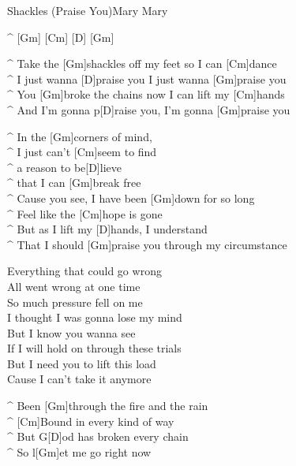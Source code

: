 \begin{song}{Shackles (Praise You)}{Mary Mary}

\begin{guitar}
^ [Gm] [Cm] [D] [Gm]\\

\end{guitar}
\begin{guitar}
^ Take the [Gm]shackles off my feet so I can [Cm]dance\\
^ I just wanna [D]praise you I just wanna [Gm]praise you\\
^ You [Gm]broke the chains now I can lift my [Cm]hands\\
^ And I'm gonna p[D]raise you, I'm gonna [Gm]praise you\\
\end{guitar}


\begin{guitar}
^ In the [Gm]corners of mind, \\
^ I just can't [Cm]seem to find\\
^ a reason to be[D]lieve \\
^ that I can [Gm]break free\\
^ Cause you see, I have been [Gm]down for so long\\
^ Feel like the [Cm]hope is gone\\
^ But as I lift my [D]hands, I understand\\
^ That I should [Gm]praise you through my circumstance\\
\end{guitar}



\begin{guitar}
Everything that could go wrong\\
All went wrong at one time\\
So much pressure fell on me\\
I thought I was gonna lose my mind\\
But I know you wanna see\\
If I will hold on through these trials\\
But I need you to lift this load\\
Cause I can't take it anymore\\
\end{guitar}




\begin{guitar}
^ Been [Gm]through the fire and the rain\\
^ [Cm]Bound in every kind of way\\
^ But G[D]od has broken every chain\\
^ So l[Gm]et me go right now\\
\end{guitar}




\end{song}
